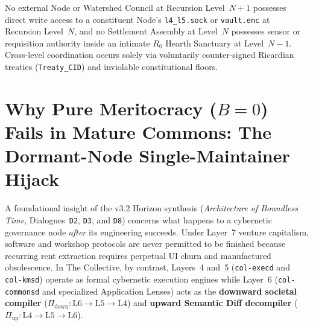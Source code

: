 \begin{invariant}
\label{inv:ch1-recursive-subsidiarity}
No external Node or Watershed Council at Recursion Level~$N+1$ possesses direct write access to
a constituent Node's \texttt{l4\_l5.sock} or \texttt{vault.enc} at Recursion Level~$N$, and no
Settlement Assembly at Level~$N$ possesses sensor or requisition authority inside an intimate
$R_0$ Hearth Sanctuary at Level~$N-1$. Cross-level coordination occurs solely via voluntarily
counter-signed Ricardian treaties (\texttt{Treaty\_CID}) and inviolable constitutional floors.
\end{invariant}

\section{Why Pure Meritocracy ($B=0$) Fails in Mature Commons: The Dormant-Node Single-Maintainer Hijack}
\label{sec:ch1-dormant-hijack}

A foundational insight of the v3.2 Horizon synthesis (\textit{Architecture of Boundless Time},
Dialogues~\texttt{D2}, \texttt{D3}, and \texttt{D8}) concerns what happens to a cybernetic
governance node \textit{after} its engineering succeeds. Under Layer~7 venture capitalism,
software and workshop protocols are never permitted to be finished because recurring rent
extraction requires perpetual UI churn and manufactured obsolescence. In The Collective, by
contrast, Layers~4 and~5 (\texttt{col-execd} and \texttt{col-kmsd}) operate as formal cybernetic
execution engines while Layer~6 (\texttt{col-commonsd} and specialized Application Lenses) acts
as the \textbf{downward societal compiler} ($\Pi_{\mathrm{down}} : \mathrm{L6} \to \mathrm{L5} \to
\mathrm{L4}$) and \textbf{upward Semantic Diff decompiler} ($\Pi_{\mathrm{up}} : \mathrm{L4} \to
\mathrm{L5} \to \mathrm{L6}$).

